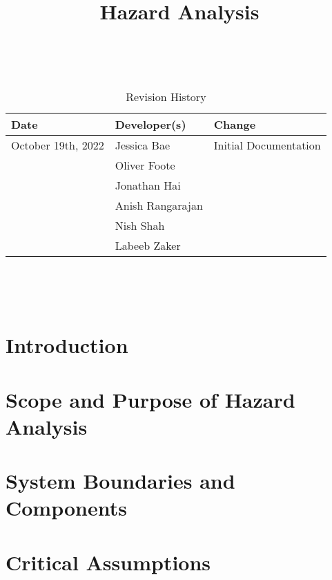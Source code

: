 \documentclass{article}
\title{Hazard Analysis\\\progname}
\author{\authname}
\date{}
\begin{document}
\maketitle
\thispagestyle{empty}

~\newpage


\begin{table}[hp]
    \caption{Revision History} \label{TblRevisionHistory}
    \begin{tabularx}{\textwidth}{llX}
        \toprule
        \textbf{Date} & \textbf{Developer(s)} & \textbf{Change}        \\
        \midrule
        October 19th, 2022 & Jessica Bae & Initial Documentation\\ 
	& Oliver Foote\\ 
	& Jonathan Hai\\
	& Anish Rangarajan\\
	& Nish Shah\\
	& Labeeb Zaker\\
        \bottomrule
    \end{tabularx}
\end{table}

~\newpage

\tableofcontents

~\newpage



\section{Introduction}


\section{Scope and Purpose of Hazard Analysis}

\section{System Boundaries and Components}

\section{Critical Assumptions}
\end{document}
